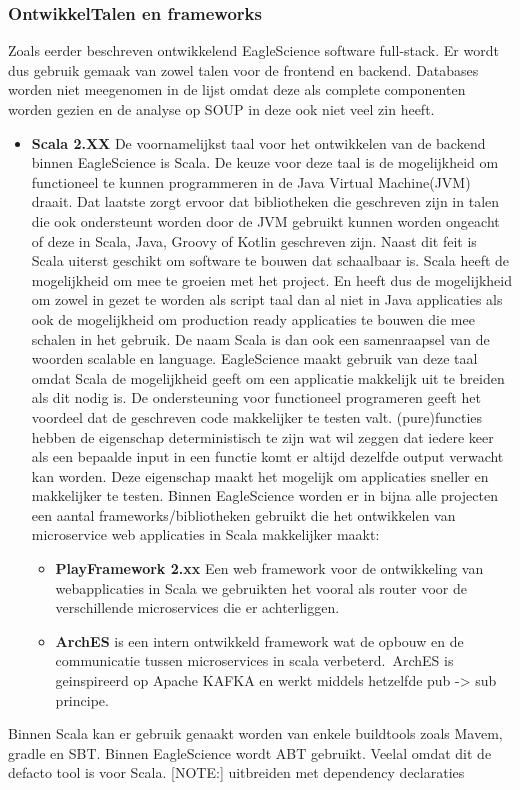 \subsubsection{OntwikkelTalen en frameworks}\label{subsec:ontwikkeltalen-en-frameworks}
Zoals eerder beschreven ontwikkelend EagleScience software full-stack. Er wordt dus gebruik gemaak van zowel talen voor de frontend en backend. Databases worden niet meegenomen in de lijst omdat deze als complete componenten worden gezien en de analyse op SOUP in deze ook niet veel zin heeft.
\begin{itemize}
    \item \textbf{Scala 2.XX} De voornamelijkst taal voor het ontwikkelen van de backend binnen EagleScience is Scala. De keuze voor deze taal is de mogelijkheid om functioneel te kunnen programmeren in de Java Virtual Machine(JVM) draait. Dat laatste zorgt ervoor dat bibliotheken die geschreven zijn in talen die ook ondersteunt worden door de JVM gebruikt kunnen worden ongeacht of deze in Scala, Java, Groovy of Kotlin geschreven zijn. Naast dit feit is Scala uiterst geschikt om software te bouwen dat schaalbaar is. Scala heeft de mogelijkheid om mee te groeien met het project. En heeft dus de mogelijkheid om zowel in gezet te worden als script taal dan al niet in Java applicaties als ook de mogelijkheid om production ready applicaties te bouwen die mee schalen in het gebruik. De naam Scala is dan ook een samenraapsel van de woorden scalable en language.
    EagleScience maakt gebruik van deze taal omdat Scala de mogelijkheid geeft om een applicatie makkelijk uit te breiden als dit nodig is. De ondersteuning voor functioneel programeren geeft het voordeel dat de geschreven code makkelijker te testen valt. (pure)functies hebben de eigenschap deterministisch te zijn wat wil zeggen dat iedere keer als een bepaalde input in een functie komt er altijd dezelfde output verwacht kan worden. Deze eigenschap maakt het mogelijk om applicaties sneller en makkelijker te testen. Binnen EagleScience worden er in bijna alle projecten een aantal frameworks/bibliotheken gebruikt die het ontwikkelen van microservice web applicaties in Scala makkelijker maakt:
    \begin{itemize}
        \item \textbf{PlayFramework 2.xx} Een web framework voor de ontwikkeling van webapplicaties in Scala we gebruikten het vooral als router voor de verschillende microservices die er achterliggen.
        \item \textbf{ArchES} is een intern ontwikkeld framework wat de opbouw en de communicatie tussen microservices in scala verbeterd.\ ArchES is geinspireerd op Apache KAFKA en werkt middels hetzelfde pub -> sub principe.
    \end{itemize}
\end{itemize}
Binnen Scala kan er gebruik genaakt worden van enkele buildtools zoals Mavem, gradle en SBT. Binnen EagleScience wordt ABT gebruikt. Veelal omdat dit de defacto tool is voor Scala.
[NOTE:] uitbreiden met dependency declaraties
